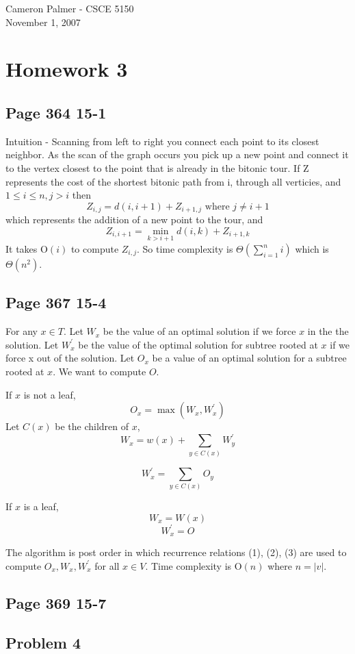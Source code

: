 \documentclass[12pt,twoside,letterpaper]{article}
\begin{document}
Cameron Palmer - CSCE 5150\\
November 1, 2007
\section*{Homework 3}
\subsection*{Page 364 15-1}
Intuition - Scanning from left to right you connect each point to its closest neighbor. As the scan of the graph occurs you pick up a new point and connect it to the vertex closest to the point that is already in the bitonic tour.
If Z represents the cost of the shortest bitonic path from i, through all verticies, and $1 \le i \le n, j > i$ then
$$Z_{i,j} = d(i, i+1) + Z_{i+1,j} \textrm{ where } j \ne i+1$$
which represents the addition of a new point to the tour, and
$$Z_{i,i+1} = \min_{k>i+1}{d(i,k) + Z_{i+1,k}}$$
It takes $\textrm{O}(i)$ to compute $Z_{i,j}$. So time complexity is $\Theta(\sum_{i=1}^n i)$ which is $\Theta(n^2)$.

\subsection*{Page 367 15-4}
For any $x \in T$. Let $W_x$ be the value of an optimal solution if we force $x$ in the the solution. Let $W_x^\prime$ be the value of the optimal solution for subtree rooted at $x$ if we force x out of the solution. Let $O_x$ be a value of an optimal solution for a subtree rooted at $x$. We want to compute $O$.

If $x$ is not a leaf,
\begin{equation}
O_x = \max(W_x,W_x^\prime)
\end{equation}
Let $C(x)$ be the children of $x$,
\begin{equation}
W_x = w(x) + \sum_{y \in C(x)} W_y^\prime
\end{equation}

\begin{equation}
W_x^\prime = \sum_{y \in C(x)} O_y
\end{equation}

If $x$ is a leaf,
$$W_x= W(x)$$
$$W_x^\prime = O$$

The algorithm is post order in which recurrence relations (1), (2), (3) are used to compute $O_x, W_x, W_x^\prime$ for all $x \in V$. Time complexity is $\textrm{O}(n)$ where $n = |v|$.

\subsection*{Page 369 15-7}

\subsection*{Problem 4}
\end{document}
